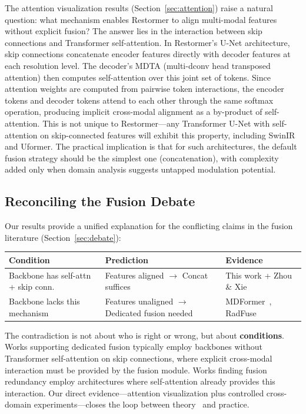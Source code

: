 \documentclass[pdflatex,sn-basic,Numbered]{sn-jnl}
\theoremstyle{thmstyleone}
\theoremstyle{thmstyletwo}
\theoremstyle{thmstylethree}
\begin{document}
The attention visualization results (Section~\ref{sec:attention}) raise a natural question: what mechanism enables Restormer to align multi-modal features without explicit fusion?
The answer lies in the interaction between skip connections and Transformer self-attention.
In Restormer's U-Net architecture, skip connections concatenate encoder features directly with decoder features at each resolution level.
The decoder's MDTA (multi-dconv head transposed attention) then computes self-attention over this joint set of tokens.
Since attention weights are computed from pairwise token interactions, the encoder tokens and decoder tokens attend to each other through the same softmax operation, producing implicit cross-modal alignment as a by-product of self-attention.
This is not unique to Restormer---any Transformer U-Net with self-attention on skip-connected features will exhibit this property, including SwinIR and Uformer.
The practical implication is that for such architectures, the default fusion strategy should be the simplest one (concatenation), with complexity added only when domain analysis suggests untapped modulation potential.

\subsection{Reconciling the Fusion Debate}

Our results provide a unified explanation for the conflicting claims in the fusion literature (Section~\ref{sec:debate}):

\begin{center}
\footnotesize
\begin{tabular}{@{}p{3.8cm}p{3.5cm}p{4.5cm}@{}}
\toprule
\textbf{Condition} & \textbf{Prediction} & \textbf{Evidence} \\
\midrule
Backbone has self-attn + skip conn. & Features aligned $\rightarrow$ Concat suffices & This work + Zhou \& Xie~\cite{zhou2026feature} \\
Backbone lacks this mechanism & Features unaligned $\rightarrow$ Dedicated fusion needed & MDFormer~\cite{mdformer2025}, RadFuse~\cite{radfuse2025} \\
\bottomrule
\end{tabular}
\end{center}

The contradiction is not about who is right or wrong, but about \textbf{conditions}.
Works supporting dedicated fusion typically employ backbones without Transformer self-attention on skip connections, where explicit cross-modal interaction must be provided by the fusion module.
Works finding fusion redundancy employ architectures where self-attention already provides this interaction.
Our direct evidence---attention visualization plus controlled cross-domain experiments---closes the loop between theory~\cite{zhou2026feature} and practice.
\end{document}
